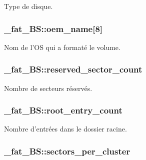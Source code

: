 Type de disque. \hypertarget{struct__fat__BS_a6e3cafc7b7a76af3f3d82b322bda2903}{
\subsubsection[{oem\-\_\-name}]{ \-\_\-fat\-\_\-\-B\-S\-::oem\-\_\-name\mbox{[}8\mbox{]}}}\label{struct__fat__BS_a6e3cafc7b7a76af3f3d82b322bda2903}
Nom de l'O\-S qui a formaté le volume. \hypertarget{struct__fat__BS_a7c4d28484980635def2bb6c1e6675b5a}{
\subsubsection[{reserved\-\_\-sector\-\_\-count}]{ \-\_\-fat\-\_\-\-B\-S\-::reserved\-\_\-sector\-\_\-count}}\label{struct__fat__BS_a7c4d28484980635def2bb6c1e6675b5a}
Nombre de secteurs réservés. \hypertarget{struct__fat__BS_ae9265a2e00c0c3cbb4de257b602bcd2c}{
\subsubsection[{root\-\_\-entry\-\_\-count}]{ \-\_\-fat\-\_\-\-B\-S\-::root\-\_\-entry\-\_\-count}}\label{struct__fat__BS_ae9265a2e00c0c3cbb4de257b602bcd2c}
Nombre d'entrées dans le dossier racine. \hypertarget{struct__fat__BS_ab26cacbe204fc157d8165af3ad86a33f}{
\subsubsection[{sectors\-\_\-per\-\_\-cluster}]{ \-\_\-fat\-\_\-\-B\-S\-::sectors\-\_\-per\-\_\-cluster}}\label{struct__fat__BS_ab26cacbe204fc157d8165af3ad86a33f}
